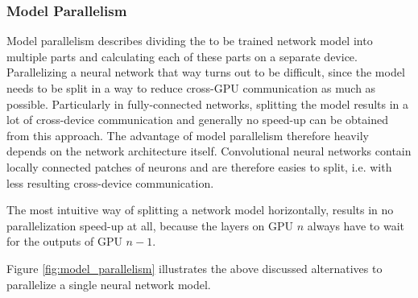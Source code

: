 \subsubsection{Model Parallelism}
Model parallelism describes dividing the to be trained network model into multiple parts and calculating each of these parts on a separate device.
Parallelizing a neural network that way turns out to be difficult, since the model needs to be split in a way to reduce cross-GPU communication as much as possible.
Particularly in fully-connected networks, splitting the model results in a lot of cross-device communication and generally no speed-up can be obtained from this approach.
The advantage of model parallelism therefore heavily depends on the network architecture itself.
Convolutional neural networks contain locally connected patches of neurons and are therefore easies to split, i.e. with less resulting cross-device communication.

The most intuitive way of splitting a network model horizontally, results in no parallelization speed-up at all, because the layers on GPU $n$ always have to wait for the outputs of GPU $n-1$.

Figure \ref{fig:model_parallelism} illustrates the above discussed alternatives to parallelize a single neural network model.


